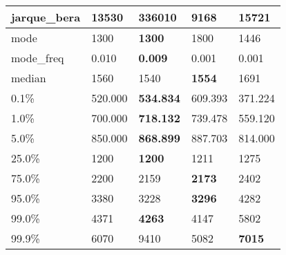 \begin{table}[H]
\begin{tabular}{|l|m{10em}|m{10em}|m{10em}|m{10em}|}
\hline jarque\_bera & 13530 & \cellcolor[rgb]{0.9, 0.54, 0.52} 336010 & 9168 & \bfseries 15721 \\
\hline mode & 1300 & \bfseries 1300 & \cellcolor[rgb]{0.9, 0.54, 0.52} 1800 & 1446 \\
\hline mode\_freq & 0.010 & \bfseries 0.009 & \cellcolor[rgb]{0.9, 0.54, 0.52} 0.001 & 0.001 \\
\hline median & 1560 & 1540 & \bfseries 1554 & \cellcolor[rgb]{0.9, 0.54, 0.52} 1691 \\
\hline 0.1\% & 520.000 & \bfseries 534.834 & 609.393 & \cellcolor[rgb]{0.9, 0.54, 0.52} 371.224 \\
\hline 1.0\% & 700.000 & \bfseries 718.132 & 739.478 & \cellcolor[rgb]{0.9, 0.54, 0.52} 559.120 \\
\hline 5.0\% & 850.000 & \bfseries 868.899 & \cellcolor[rgb]{0.9, 0.54, 0.52} 887.703 & 814.000 \\
\hline 25.0\% & 1200 & \bfseries 1200 & 1211 & \cellcolor[rgb]{0.9, 0.54, 0.52} 1275 \\
\hline 75.0\% & 2200 & 2159 & \bfseries 2173 & \cellcolor[rgb]{0.9, 0.54, 0.52} 2402 \\
\hline 95.0\% & 3380 & 3228 & \bfseries 3296 & \cellcolor[rgb]{0.9, 0.54, 0.52} 4282 \\
\hline 99.0\% & 4371 & \bfseries 4263 & 4147 & \cellcolor[rgb]{0.9, 0.54, 0.52} 5802 \\
\hline 99.9\% & 6070 & \cellcolor[rgb]{0.9, 0.54, 0.52} 9410 & 5082 & \bfseries 7015 \\
\hline
\end{tabular}
\end{table}
